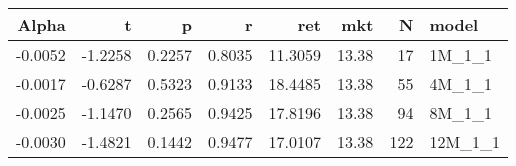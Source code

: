 \begin{table}[ht]
\centering
\begin{tabular}{rrrrrrrl}
  \hline
Alpha & t & p & r & ret & mkt & N & model \\ 
  \hline
-0.0052 & -1.2258 & 0.2257 & 0.8035 & 11.3059 & 13.38 & 17 & 1M\_1\_1 \\ 
  -0.0017 & -0.6287 & 0.5323 & 0.9133 & 18.4485 & 13.38 & 55 & 4M\_1\_1 \\ 
  -0.0025 & -1.1470 & 0.2565 & 0.9425 & 17.8196 & 13.38 & 94 & 8M\_1\_1 \\ 
  -0.0030 & -1.4821 & 0.1442 & 0.9477 & 17.0107 & 13.38 & 122 & 12M\_1\_1 \\ 
   \hline
\end{tabular}
\end{table}

